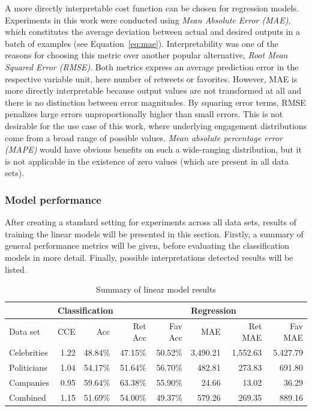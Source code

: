 A more directly interpretable cost function can be chosen for regression models.
Experiments in this work were conducted using \textit{Mean Absolute Error (MAE)},
which constitutes the average deviation between actual and desired outputs
in a batch of examples (see Equation~\ref{eq:mae}).
Interpretability was one of the reasons for choosing this metric over another popular alternative,
\textit{Root Mean Squared Error (RMSE)}.
Both metrics express an average prediction error in the respective variable unit,
here number of retweets or favorites.
However, MAE is more directly interpretable because output values
are not transformed at all and there is no distinction between error magnitudes.
By squaring error terms, RMSE penalizes large errors unproportionally higher
than small errors.
This is not desirable for the use case of this work, where underlying
engagement distributions come from a broad range of possible values.
\textit{Mean absolute percentage error (MAPE)} would have obvious benefits
on such a wide-ranging distribution, but it is not applicable in the existence
of zero values (which are present in all data sets).

\subsubsection{Model performance}
\label{sub:lin_performance}

After creating a standard setting for experiments across all data sets, 
results of training the linear models will be presented in this section.
Firstly, a summary of general performance metrics will be given, before
evaluating the classification models in more detail.
Finally, possible interpretations detected results will be listed.

\begin{table}
  \begin{tabular}{lrrrrrrr}
    \toprule
    & \multicolumn{4}{l}{Classification} & \multicolumn{3}{l}{Regression} \\
    \midrule
    Data set & CCE & Acc & Ret Acc & Fav Acc & MAE & Ret MAE & Fav MAE \\
    \midrule
    Celebrities & 1.22 & 48.84\% & 47.15\% & 50.52\% & 3,490.21 & 1,552.63 & 5,427.79 \\
    Politicians & 1.04 & 54.17\% & 51.64\% & 56.70\% & 482.81 & 273.83 & 691.80 \\
    Companies & 0.95 & 59.64\% & 63.38\% & 55.90\% & 24.66 & 13.02 & 36.29 \\
    Combined & 1.15 & 51.69\% & 54.00\% & 49.37\% & 579.26 & 269.35 & 889.16 \\
    \bottomrule
  \end{tabular}
  \caption{Summary of linear model results}
  \label{tab:lin_model_results}
\end{table}

